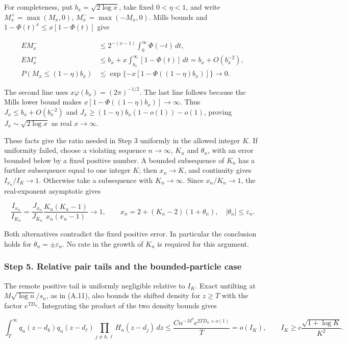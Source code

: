 \documentclass{article}
\begin{document}
For completeness, put \(b_x=\sqrt{2\log x}\), take fixed \(0<\eta<1\),
and write \(M_x^+=\max(M_x,0)\), \(M_x^-=\max(-M_x,0)\). Mills bounds
and \(1-\Phi(t)^x\le x[1-\Phi(t)]\) give

\[
\begin{aligned}
E M_x^-&\le 2^{-(x-1)}\int_0^\infty\Phi(-t)\,dt,\\
E M_x^+&\le b_x+x\int_{b_x}^\infty[1-\Phi(t)]\,dt=b_x+O(b_x^{-2}),\\
P(M_x\le(1-\eta)b_x)
&\le\exp\{-x[1-\Phi((1-\eta)b_x)]\}\longrightarrow0.
\end{aligned}
\]

The second line uses \(x\varphi(b_x)=(2\pi)^{-1/2}\). The last line
follows because the Mills lower bound makes
\(x[1-\Phi((1-\eta)b_x)]\to\infty\). Thus \(J_x\le b_x+O(b_x^{-2})\) and
\(J_x\ge(1-\eta)b_x(1-o(1))-o(1)\), proving \(J_x\sim\sqrt{2\log x}\) as
real \(x\to\infty\).

These facts give the ratio needed in Step 3 uniformly in the allowed
integer \(K\). If uniformity failed, choose a violating sequence
\(n\to\infty\), \(K_n\) and \(\theta_n\), with an error bounded below by
a fixed positive number. A bounded subsequence of \(K_n\) has a further
subsequence equal to one integer \(K\); then \(x_n\to K\), and
continuity gives \(I_{x_n}/I_K\to1\). Otherwise take a subsequence with
\(K_n\to\infty\). Since \(x_n/K_n\to1\), the real-exponent asymptotic
gives

\[
\frac{I_{x_n}}{I_{K_n}}
=\frac{J_{x_n}}{J_{K_n}}
\frac{K_n(K_n-1)}{x_n(x_n-1)}\longrightarrow1,\qquad
x_n=2+(K_n-2)(1+\theta_n),\quad |\theta_n|\le\varepsilon_n.
\]

Both alternatives contradict the fixed positive error. In particular the
conclusion holds for \(\theta_n=\pm\varepsilon_n\). No rate in the
growth of \(K_n\) is required for this argument.

\subsubsection*{Step 5. Relative pair tails and the bounded-particle
case}\label{step-5.-relative-pair-tails-and-the-bounded-particle-case}

The remote positive tail is uniformly negligible relative to \(I_K\).
Exact untilting at \(M\sqrt{\log n}/s_n\), as in (A.11), also bounds the
shifted density for \(z\ge T\) with the factor \(e^{TD_n}\). Integrating
the product of the two density bounds gives

\[
\int_T^\infty q_n(z-d_k)q_n(z-d_\ell)
\prod_{j\ne k,\ell}H_n(z-d_j)\,dz
\le \frac{C n^{-M^2}e^{2TD_n+o(1)}}{T}=o(I_K),\qquad
I_K\ge c\frac{\sqrt{1+\log K}}{K^2}.
\]
\end{document}
